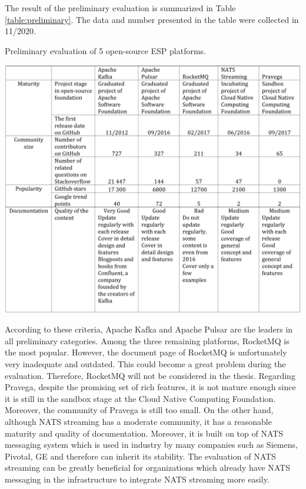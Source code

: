 The result of the preliminary evaluation is summarized in Table \ref{table:preliminary}. The data and number presented in the table were collected in 11/2020.

\begin{table}[h]
	\caption{Preliminary evaluation of 5 open-source ESP platforms.}
	\label{table:preliminary}
	\includegraphics[width=\linewidth]{images/preliminary}
\end{table}

According to these criteria, Apache Kafka and Apache Pulsar are the leaders in all preliminary categories. Among the three remaining platforms, RocketMQ is the most popular. However, the document page of RocketMQ is unfortunately very inadequate and outdated. This could become a great problem during the evaluation.  Therefore, RocketMQ will not be considered in the thesis. Regarding Pravega, despite the promising set of rich features, it is not mature enough since it is still in the sandbox stage at the Cloud Native Computing Foundation. Moreover, the community of Pravega is still too small. On the other hand, although NATS streaming has a moderate community, it has a reasonable maturity and quality of documentation. Moreover, it is built on top of NATS messaging system which is used in industry by many companies such as Siemens, Pivotal, GE and therefore can inherit its stability. The evaluation of NATS streaming can be greatly beneficial for organizations which already have NATS messaging in the infrastructure to integrate NATS streaming more easily.

